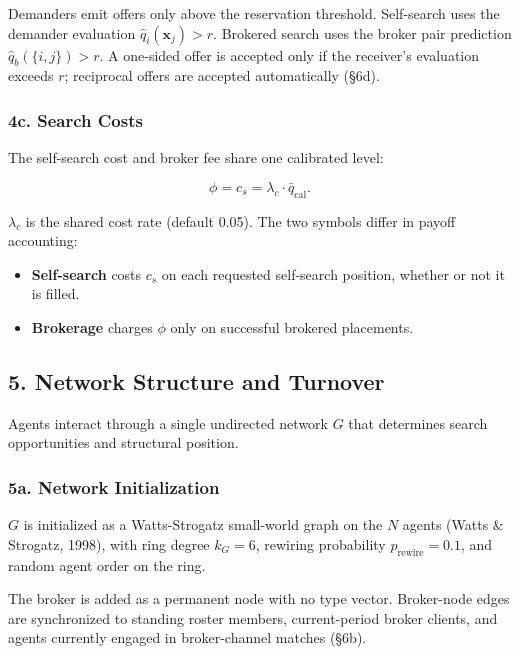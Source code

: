 \documentclass[11pt]{article}
\providecommand{\tightlist}{%
  \setlength{\itemsep}{0pt}\setlength{\parskip}{0pt}}
\begin{document}
Demanders emit offers only above the reservation threshold. Self-search uses the demander evaluation \(\hat{q}_{i}(\mathbf{x}_j)>r\). Brokered search uses the broker pair prediction \(\hat{q}_b(\{i,j\})>r\). A one-sided offer is accepted only if the receiver's evaluation exceeds \(r\); reciprocal offers are accepted automatically (§6d).

\subsubsection{4c. Search Costs}\label{c.-search-costs}

The self-search cost and broker fee share one calibrated level:

\[
\phi = c_s = \lambda_c \cdot \bar{q}_{\text{cal}}.
\]

\(\lambda_c\) is the shared cost rate (default 0.05). The two symbols differ in payoff accounting:

\begin{itemize}
\tightlist
\item \textbf{Self-search} costs \(c_s\) on each requested self-search position, whether or not it is filled.
\item \textbf{Brokerage} charges \(\phi\) only on successful brokered placements.
\end{itemize}

\subsection{5. Network Structure and Turnover}\label{network-structure-and-turnover}

Agents interact through a single undirected network \(G\) that determines search opportunities and structural position.

\subsubsection{5a. Network Initialization}\label{a.-network-initialization}

\(G\) is initialized as a Watts-Strogatz small-world graph on the \(N\) agents (Watts \& Strogatz, 1998), with ring degree \(k_G = 6\), rewiring probability \(p_{\text{rewire}} = 0.1\), and random agent order on the ring.

The broker is added as a permanent node with no type vector. Broker-node edges are synchronized to standing roster members, current-period broker clients, and agents currently engaged in broker-channel matches (§6b).
\end{document}
